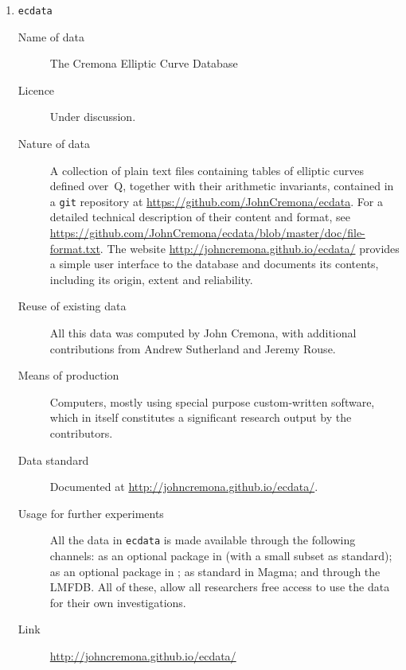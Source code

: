 \documentclass{deliverablereport}
\begin{document}
\begin{enumerate}
\item{{\tt ecdata}}
\begin{description}
\item[Name of data] The Cremona Elliptic Curve Database
\item[Licence]  Under discussion.
\item[Nature of data] A collection of plain text files containing tables of elliptic curves defined over~Q, together with their arithmetic invariants, contained in a {\tt git} repository at  \url{https://github.com/JohnCremona/ecdata}.  For a detailed technical description of their content and format, see  \url{https://github.com/JohnCremona/ecdata/blob/master/doc/file-format.txt}. The website  \url{http://johncremona.github.io/ecdata/} provides a simple user interface to the database and documents its contents, including its origin, extent and reliability.
\item[Reuse of existing data] All this data was computed by John Cremona, with additional contributions from Andrew Sutherland and Jeremy Rouse.
\item[Means of production] Computers, mostly using special purpose custom-written software, which in itself constitutes a significant research output by the contributors.
\item[Data standard] Documented at \url{http://johncremona.github.io/ecdata/}.
\item [Usage for further experiments] All the data in {\tt ecdata} is made available through the following channels: as an optional package in \Sage (with a small subset as standard); as an optional package in \PariGP; as standard in Magma; and through the LMFDB.  All of these, allow all researchers free access to use the data for their own investigations.
\item [Link] \url{http://johncremona.github.io/ecdata/}
\end{description}


\end{enumerate}
\end{document}
